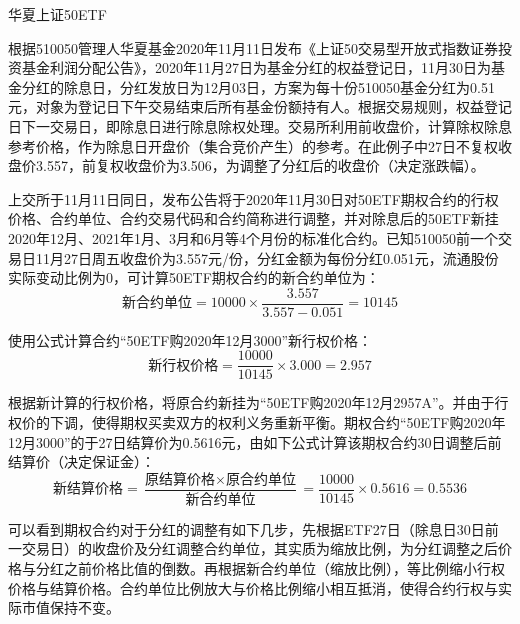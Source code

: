 \documentclass[11pt]{article}
\begin{document}
\begin{example}

华夏上证50ETF

根据510050管理人华夏基金2020年11月11日发布《上证50交易型开放式指数证券投资基金利润分配公告》，2020年11月27日为基金分红的权益登记日，11月30日为基金分红的除息日，分红发放日为12月03日，方案为每十份510050基金分红为0.51元，对象为登记日下午交易结束后所有基金份额持有人。根据交易规则，权益登记日下一交易日，即除息日进行除息除权处理。交易所利用前收盘价，计算除权除息参考价格，作为除息日开盘价（集合竞价产生）的参考。在此例子中27日不复权收盘价3.557，前复权收盘价为3.506，为调整了分红后的收盘价（决定涨跌幅）。

上交所于11月11日同日，发布公告将于2020年11月30日对50ETF期权合约的行权价格、合约单位、合约交易代码和合约简称进行调整，并对除息后的50ETF新挂2020年12月、2021年1月、3月和6月等4个月份的标准化合约。已知510050前一个交易日11月27日周五收盘价为3.557元/份，分红金额为每份分红0.051元，流通股份实际变动比例为0，可计算50ETF期权合约的新合约单位为：
\begin{equation*}
    \text{新合约单位} = 10000 \times \frac{3.557}{3.557-0.051} = 10145
\end{equation*}

使用公式计算合约“50ETF购2020年12月3000”新行权价格：
\begin{equation*}
    \text{新行权价格} = \frac{10000}{10145} \times 3.000 = 2.957
\end{equation*}

根据新计算的行权价格，将原合约新挂为“50ETF购2020年12月2957A”。并由于行权价的下调，使得期权买卖双方的权利义务重新平衡。期权合约“50ETF购2020年12月3000”的于27日结算价为0.5616元，由如下公式计算该期权合约30日调整后前结算价（决定保证金）：
\begin{equation*}
    \text{新结算价格} = \frac{\text{原结算价格}\times\text{原合约单位}}{\text{新合约单位}} = \frac{10000}{10145} \times 0.5616 = 0.5536
\end{equation*}

可以看到期权合约对于分红的调整有如下几步，先根据ETF27日（除息日30日前一交易日）的收盘价及分红调整合约单位，其实质为缩放比例，为分红调整之后价格与分红之前价格比值的倒数。再根据新合约单位（缩放比例），等比例缩小行权价格与结算价格。合约单位比例放大与价格比例缩小相互抵消，使得合约行权与实际市值保持不变。

\end{example}

\divider
\end{document}
